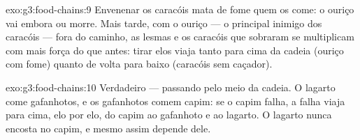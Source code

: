 \begin{solution}{exo:g3:food-chains:9}
Envenenar os caracóis mata de fome quem os come: o ouriço vai embora
ou morre. Mais tarde, com o ouriço --- o principal inimigo dos
caracóis --- fora do caminho, as lesmas e os caracóis que sobraram
se multiplicam com mais força do que antes: tirar elos viaja tanto
para cima da cadeia (ouriço com fome) quanto de volta para baixo
(caracóis sem caçador).
\end{solution}

\begin{solution}{exo:g3:food-chains:10}
Verdadeiro --- passando pelo meio da cadeia. O lagarto come
gafanhotos, e os gafanhotos comem capim: se o capim falha, a falha
viaja para cima, elo por elo, do capim ao gafanhoto e ao lagarto. O
lagarto nunca encosta no capim, e mesmo assim depende dele.
\end{solution}

